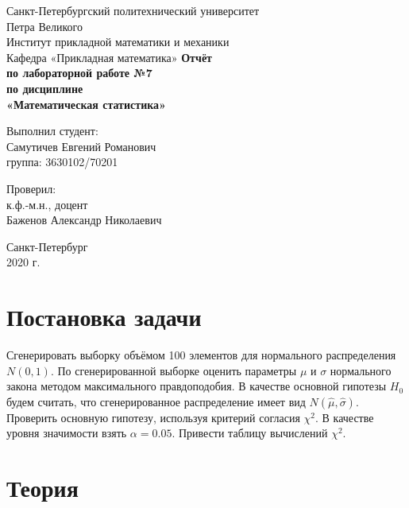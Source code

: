 \documentclass[12pt,a4paper]{article}
\begin{document}
	
\begin{titlepage}
	\begin{center}		
		\vfill	
		Санкт-Петербургский политехнический университет \\
		Петра Великого\\
		\vskip 1cm
		Институт прикладной математики и механики \\
		Кафедра «Прикладная математика»
		\vfill
		\textbf{Отчёт\\
			по лабораторной работе №7\\
			по дисциплине\\
			«Математическая статистика»\\}
		\vfill
	\end{center}
	\vfill
	\hfill
	\begin{minipage}{0.4\textwidth}
		Выполнил студент:\\
		Самутичев Евгений Романович\\
		группа: 3630102/70201\\
	\end{minipage}
	\vfill
	\hfill 
	\begin{minipage}{0.4\textwidth}
		Проверил:\\
		к.ф.-м.н., доцент\\
		Баженов Александр Николаевич\
	\end{minipage}
	\vfill
	\begin{center}
		Санкт-Петербург\\2020 г.
	\end{center}
\end{titlepage}

\tableofcontents
\listoffigures
\pagebreak

\section{Постановка задачи}
Сгенерировать выборку объёмом 100 элементов для нормального распределения $N(0, 1)$. По сгенерированной выборке оценить параметры $\mu$ и $\sigma$ нормального закона методом максимального правдоподобия. В качестве основной гипотезы $H_0$ будем считать, что сгенерированное распределение имеет вид $N(\widehat{\mu}, \widehat{\sigma})$. Проверить основную гипотезу, используя критерий согласия $\chi^2$. В качестве уровня значимости взять $\alpha = 0.05$. Привести таблицу вычислений $\chi^2$.
\pagebreak

\section{Теория}
\end{document}
